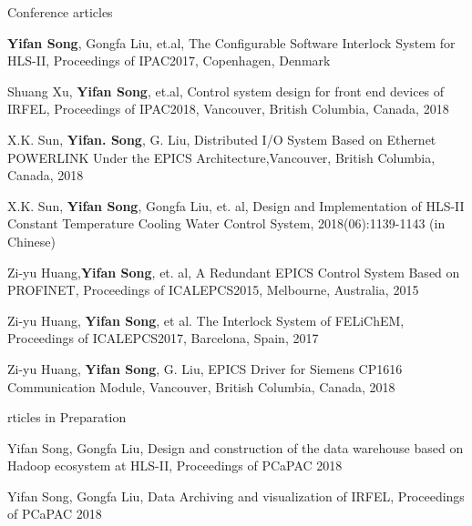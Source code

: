 \begin{cventries}
\cventry
   {Conference articles} %
   {} %
   {} %
   {} %
   {
   	\begin{cvitems} %
   		\item {\textbf{Yifan Song}, Gongfa Liu, et.al, The Configurable Software Interlock System for HLS-II, Proceedings of IPAC2017, Copenhagen, Denmark}
   		\item {Shuang Xu, \textbf{Yifan Song}, et.al, Control system design for front end devices of IRFEL, Proceedings of IPAC2018, Vancouver, British Columbia, Canada, 2018}
   		\item{X.K. Sun, \textbf{Yifan. Song}, G. Liu, Distributed I/O System Based on Ethernet POWERLINK Under the EPICS Architecture,Vancouver, British Columbia, Canada, 2018}
   		\item{X.K. Sun, \textbf{Yifan Song}, Gongfa Liu, et. al, Design and Implementation of HLS-II Constant Temperature Cooling Water Control System, 2018(06):1139-1143 (in Chinese)}
   		\item {Zi-yu Huang,\textbf{Yifan Song}, et. al, A Redundant EPICS Control System Based on PROFINET, Proceedings of ICALEPCS2015, Melbourne, Australia, 2015}
   		\item {Zi-yu Huang, \textbf{Yifan Song}, et al. The Interlock System of FELiChEM, Proceedings of ICALEPCS2017, Barcelona, Spain, 2017}
   		\item {Zi-yu Huang, \textbf{Yifan Song}, G. Liu, EPICS Driver for Siemens CP1616 Communication Module, Vancouver, British Columbia, Canada, 2018}
   	\end{cvitems}
   }

  \cventry
    {rticles in Preparation} %
    {} %
    {} %
    {} %
    {
      \begin{cvitems} %
        \item {Yifan Song, Gongfa Liu, Design and construction of the data warehouse based on Hadoop ecosystem at HLS-II, Proceedings of PCaPAC 2018}
        \item {Yifan Song, Gongfa Liu, Data Archiving and visualization of IRFEL, Proceedings of PCaPAC 2018}
      \end{cvitems}
    }
   
\end{cventries}
